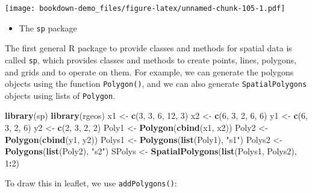 \documentclass[]{book}
\newenvironment{Shaded}{\begin{snugshade}}{\end{snugshade}}
\newcommand{\KeywordTok}[1]{\textcolor[rgb]{0.13,0.29,0.53}{\textbf{#1}}}
\newcommand{\DataTypeTok}[1]{\textcolor[rgb]{0.13,0.29,0.53}{#1}}
\newcommand{\DecValTok}[1]{\textcolor[rgb]{0.00,0.00,0.81}{#1}}
\newcommand{\StringTok}[1]{\textcolor[rgb]{0.31,0.60,0.02}{#1}}
\newcommand{\OperatorTok}[1]{\textcolor[rgb]{0.81,0.36,0.00}{\textbf{#1}}}
\newcommand{\NormalTok}[1]{#1}
\providecommand{\tightlist}{%
  \setlength{\itemsep}{0pt}\setlength{\parskip}{0pt}}
\begin{document}
\texttt{[image: bookdown-demo\_files/figure-latex/unnamed-chunk-105-1.pdf]}

\begin{itemize}
\tightlist
\item
  The \texttt{sp} package
\end{itemize}

The first general R package to provide classes and methods for spatial
data is called \texttt{sp}, which provides classes and methods to create
points, lines, polygons, and grids and to operate on them. For example,
we can generate the polygons objects using the function
\texttt{Polygon()}, and we can also generate \texttt{SpatialPolygons}
objects using lists of \texttt{Polygon}.

\begin{Shaded}
\begin{Highlighting}[]
\KeywordTok{library}\NormalTok{(sp)}
\KeywordTok{library}\NormalTok{(rgeos)}
\NormalTok{x1 <-}\StringTok{ }\KeywordTok{c}\NormalTok{(}\DecValTok{3}\NormalTok{, }\DecValTok{3}\NormalTok{, }\DecValTok{6}\NormalTok{, }\DecValTok{12}\NormalTok{, }\DecValTok{3}\NormalTok{)}
\NormalTok{x2 <-}\StringTok{ }\KeywordTok{c}\NormalTok{(}\DecValTok{6}\NormalTok{, }\DecValTok{3}\NormalTok{, }\DecValTok{2}\NormalTok{, }\DecValTok{6}\NormalTok{, }\DecValTok{6}\NormalTok{)}
\NormalTok{y1 <-}\StringTok{ }\KeywordTok{c}\NormalTok{(}\DecValTok{6}\NormalTok{, }\DecValTok{3}\NormalTok{, }\DecValTok{2}\NormalTok{, }\DecValTok{6}\NormalTok{)}
\NormalTok{y2 <-}\StringTok{ }\KeywordTok{c}\NormalTok{(}\DecValTok{2}\NormalTok{, }\DecValTok{3}\NormalTok{, }\DecValTok{2}\NormalTok{, }\DecValTok{2}\NormalTok{)}
\NormalTok{Poly1 <-}\StringTok{ }\KeywordTok{Polygon}\NormalTok{(}\KeywordTok{cbind}\NormalTok{(x1, x2))}
\NormalTok{Poly2 <-}\StringTok{ }\KeywordTok{Polygon}\NormalTok{(}\KeywordTok{cbind}\NormalTok{(y1, y2))}
\NormalTok{Polys1 <-}\StringTok{ }\KeywordTok{Polygons}\NormalTok{(}\KeywordTok{list}\NormalTok{(Poly1), }\StringTok{"s1"}\NormalTok{)}
\NormalTok{Polys2 <-}\StringTok{ }\KeywordTok{Polygons}\NormalTok{(}\KeywordTok{list}\NormalTok{(Poly2), }\StringTok{"s2"}\NormalTok{)}
\NormalTok{SPolys <-}\StringTok{ }\KeywordTok{SpatialPolygons}\NormalTok{(}\KeywordTok{list}\NormalTok{(Polys1, Polys2), }\DecValTok{1}\OperatorTok{:}\DecValTok{2}\NormalTok{)}
\end{Highlighting}
\end{Shaded}

To draw this in leaflet, we use \texttt{addPolygons()}:

\begin{Shaded}
\end{Shaded}
\end{document}
